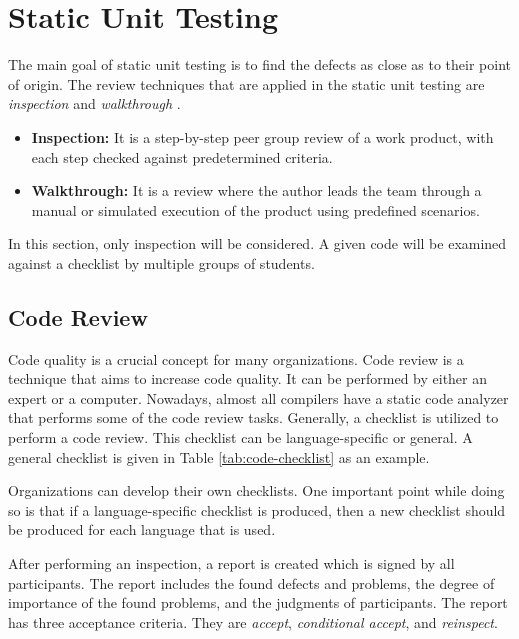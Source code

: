 \chapter{Static Unit Testing}
The main goal of static unit testing is to find the defects as close as to their point of origin. The review techniques that are applied in the static unit testing are \emph{inspection} and \emph{walkthrough} \autocite{naik2011software}.
\begin{itemize}
    \item \textbf{Inspection:} It is a step-by-step peer group review of a work product, with each step checked against predetermined criteria.
    \item \textbf{Walkthrough:} It is a review where the author leads the team through a manual or simulated execution of the product using predefined scenarios.
\end{itemize}
In this section, only inspection will be considered. A given code will be examined against a checklist by multiple groups of students.

\section{Code Review}
Code quality is a crucial concept for many organizations. Code review is a technique that aims to increase code quality. It can be performed by either an expert or a computer. Nowadays, almost all compilers have a static code analyzer that performs some of the code review tasks. Generally, a checklist is utilized to perform a code review. This checklist can be language-specific or general. A general checklist is given in Table \ref{tab:code-checklist} as an example.

Organizations can develop their own checklists. One important point while doing so is that if a language-specific checklist is produced, then a new checklist should be produced for each language that is used.

After performing an inspection, a report is created which is signed by all participants. The report includes the found defects and problems, the degree of importance of the found problems, and the judgments of participants. The report has three acceptance criteria. They are \emph{accept}, \emph{conditional accept}, and \emph{reinspect}.

